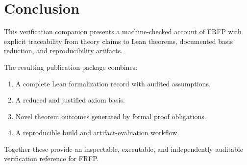 \section{Conclusion}

This verification companion presents a machine-checked account of FRFP with
explicit traceability from theory claims to Lean theorems, documented basis
reduction, and reproducibility artifacts.

The resulting publication package combines:
\begin{enumerate}
	\item A complete Lean formalization record with audited assumptions.
	\item A reduced and justified axiom basis.
	\item Novel theorem outcomes generated by formal proof obligations.
	\item A reproducible build and artifact-evaluation workflow.
\end{enumerate}

Together these provide an inspectable, executable, and independently auditable
verification reference for FRFP.
